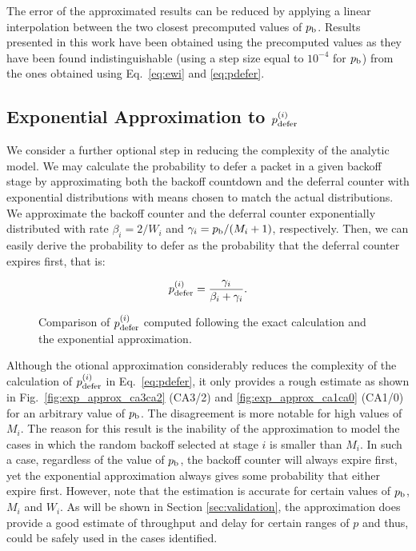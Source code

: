 \documentclass[preprint,12pt]{elsarticle}
\begin{document}
The error of the approximated results can be reduced by applying a linear interpolation between the two closest precomputed values of $p_{\rm b}$. Results presented in this work have been obtained using the precomputed values as they have been found indistinguishable (using a step size equal to $10^{-4}$ for $p_{\rm b}$) from the ones obtained using Eq.~\ref{eq:ewi} and \ref{eq:pdefer}. 

\subsection{Exponential Approximation to $p_{\rm defer}^{(i)}$}

We consider a further optional step in reducing the complexity of the analytic model. We may calculate the probability to defer a packet in a given backoff stage by approximating both the backoff countdown and the deferral counter with exponential distributions with means chosen to match the actual distributions. We approximate the backoff counter and the deferral counter exponentially distributed with rate $\beta_i=2/W_i$ and $\gamma_i=p_{\rm b}/(M_i+1)$, respectively. Then, we can easily derive the probability to defer as the probability that the deferral counter expires first, that is:

\begin{equation}\label{eq:pdefer_exp_approx}
p_{\rm defer}^{(i)}=\frac{\gamma_i}{\beta_i+\gamma_i}.
\end{equation}

\begin{figure}[t!!!!!]
\centering
{}
\caption{Comparison of $p_{\rm defer}^{(i)}$ computed following the exact calculation and the exponential approximation.}
\label{fig:exp_approx_comp}
\end{figure}

Although the otional approximation considerably reduces the complexity of the calculation of $p_{\rm defer}^{(i)}$ in Eq.~\ref{eq:pdefer}, it only provides a rough estimate as shown in Fig.~\ref{fig:exp_approx_ca3ca2} (CA3/2) and \ref{fig:exp_approx_ca1ca0} (CA1/0) for an arbitrary value of $p_{\rm b}$. The disagreement is more notable for high values of $M_i$. The reason for this result is the inability of the approximation to model the cases in which the random backoff selected at stage $i$ is smaller than $M_i$. In such a case, regardless of the value of $p_{\rm b}$, the backoff counter will always expire first, yet the exponential approximation always gives some probability that either expire first. However, note that the estimation is accurate for certain values of $p_{\rm b}$, $M_i$ and $W_i$. As will be shown in Section \ref{sec:validation}, the approximation does provide a good estimate of throughput and delay for certain ranges of $p$ and thus, could be safely used in the cases identified.
\end{document}
